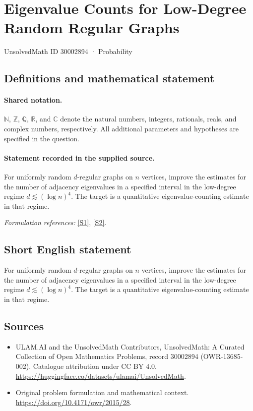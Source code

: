 \documentclass[11pt]{article}
\newcommand{\sref}[2]{\hyperlink{source:#1:#2}{[S#2]}}
\begin{document}
\setcounter{section}{30002893}
\section{Eigenvalue Counts for Low-Degree Random Regular Graphs}\label{30002894}
{\small UnsolvedMath ID 30002894 · Probability}
\subsection{Definitions and mathematical statement}

\paragraph{Shared notation.}$\mathbb N$, $\mathbb Z$, $\mathbb Q$, $\mathbb R$, and $\mathbb C$ denote the natural numbers, integers, rationals, reals, and complex numbers, respectively. All additional parameters and hypotheses are specified in the question.


\paragraph{Statement recorded in the supplied source.}
For uniformly random $d$-regular graphs on $n$ vertices, improve the estimates for the number of adjacency eigenvalues in a specified interval in the low-degree regime $d\lesssim(\log n)^4$. The target is a quantitative eigenvalue-counting estimate in that regime.
\par\smallskip\textit{Formulation references:} \sref{30002894}{1}, \sref{30002894}{2}.
\subsection{Short English statement}
For uniformly random $d$-regular graphs on $n$ vertices, improve the estimates for the number of adjacency eigenvalues in a specified interval in the low-degree regime $d\lesssim(\log n)^4$. The target is a quantitative eigenvalue-counting estimate in that regime.
\subsection{Sources}
\begin{itemize}
\item[\hypertarget{source:30002894:1}{S1}] ULAM.AI and the UnsolvedMath Contributors, UnsolvedMath: A Curated Collection of Open Mathematics Problems, record 30002894 (OWR-13685-002). Catalogue attribution under CC BY 4.0.
\url{https://huggingface.co/datasets/ulamai/UnsolvedMath}.
\item[\hypertarget{source:30002894:2}{S2}] Original problem formulation and mathematical context.
\url{https://doi.org/10.4171/owr/2015/28}.
\end{itemize}
\label{end:30002894}
\end{document}
